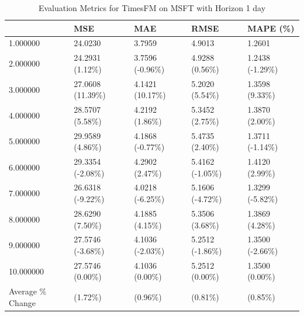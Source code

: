 \begin{table}
\caption{Evaluation Metrics for TimesFM on MSFT with Horizon 1 day}
\label{tab:fm_MSFT_h1_metrics}
\begin{tabular}{lllll}
\toprule
 & MSE & MAE & RMSE & MAPE (\%) \\
\midrule
1.000000 & 24.0230 & 3.7959 & 4.9013 & 1.2601 \\
2.000000 & 24.2931 (1.12\%) & 3.7596 (-0.96\%) & 4.9288 (0.56\%) & 1.2438 (-1.29\%) \\
3.000000 & 27.0608 (11.39\%) & 4.1421 (10.17\%) & 5.2020 (5.54\%) & 1.3598 (9.33\%) \\
4.000000 & 28.5707 (5.58\%) & 4.2192 (1.86\%) & 5.3452 (2.75\%) & 1.3870 (2.00\%) \\
5.000000 & 29.9589 (4.86\%) & 4.1868 (-0.77\%) & 5.4735 (2.40\%) & 1.3711 (-1.14\%) \\
6.000000 & 29.3354 (-2.08\%) & 4.2902 (2.47\%) & 5.4162 (-1.05\%) & 1.4120 (2.99\%) \\
7.000000 & 26.6318 (-9.22\%) & 4.0218 (-6.25\%) & 5.1606 (-4.72\%) & 1.3299 (-5.82\%) \\
8.000000 & 28.6290 (7.50\%) & 4.1885 (4.15\%) & 5.3506 (3.68\%) & 1.3869 (4.28\%) \\
9.000000 & 27.5746 (-3.68\%) & 4.1036 (-2.03\%) & 5.2512 (-1.86\%) & 1.3500 (-2.66\%) \\
10.000000 & 27.5746 (0.00\%) & 4.1036 (0.00\%) & 5.2512 (0.00\%) & 1.3500 (0.00\%) \\
Average \% Change & (1.72\%) & (0.96\%) & (0.81\%) & (0.85\%) \\
\bottomrule
\end{tabular}
\end{table}
